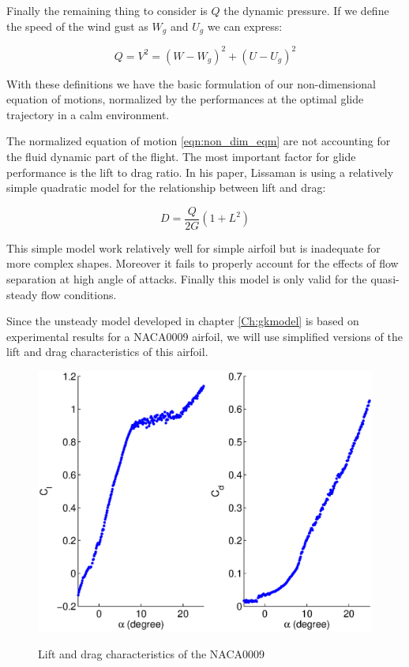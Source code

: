 \par Finally the remaining thing to consider is $Q$ the dynamic pressure. If we define the speed of the wind gust as $W_g$ and $U_g$ we can express:

\begin{equation}
Q = V^2 = (W-W_g)^2 + (U-U_g)^2
\label{eqn:q_def}
\end{equation}

\par With these definitions we have the basic formulation of our non-dimensional equation of motions, normalized by the performances at the optimal glide trajectory in a calm environment.

The normalized equation of motion \ref{eqn:non_dim_eqm} are not accounting for the fluid dynamic part of the flight.
The most important factor for glide performance is the lift to drag ratio. 
In his paper, Lissaman \cite{Lissaman2007neutral} is using a relatively simple quadratic model for the relationship between lift and drag:

\begin{equation}
D=\frac{Q}{2G}(1+L^2)
\label{eqn:Lissaman_G}
\end{equation}


\par This simple model work relatively well for simple airfoil but is inadequate for more complex shapes.
Moreover it fails to properly account for the effects of flow separation at high angle of attacks.
Finally this model is only valid for the quasi-steady flow conditions.

\par Since the unsteady model developed in chapter \ref{Ch:gkmodel} is based on experimental results for a NACA0009 airfoil, we will use simplified versions of the lift and drag characteristics of this airfoil.

\begin{figure}[ht]
\begin{center}
  \scalebox{0.8}
  {\includegraphics{./Figures/NACA0009_steady_map_Cl_Cd.eps}} 
\end{center}
\caption{Lift and drag characteristics of the NACA0009}
\end{figure}


